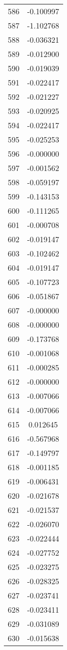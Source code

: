 \documentclass[12pt]{article}
\begin{document}
\begin{longtable}{@{}cc@{}}
586 & -0.100997 \\
587 & -1.102768 \\
588 & -0.036321 \\
589 & -0.012900 \\
590 & -0.019039 \\
591 & -0.022417 \\
592 & -0.021227 \\
593 & -0.020925 \\
594 & -0.022417 \\
595 & -0.025253 \\
596 & -0.000000 \\
597 & -0.001562 \\
598 & -0.059197 \\
599 & -0.143153 \\
600 & -0.111265 \\
601 & -0.000708 \\
602 & -0.019147 \\
603 & -0.102462 \\
604 & -0.019147 \\
605 & -0.107723 \\
606 & -0.051867 \\
607 & -0.000000 \\
608 & -0.000000 \\
609 & -0.173768 \\
610 & -0.001068 \\
611 & -0.000285 \\
612 & -0.000000 \\
613 & -0.007066 \\
614 & -0.007066 \\
615 & 0.012645 \\
616 & -0.567968 \\
617 & -0.149797 \\
618 & -0.001185 \\
619 & -0.006431 \\
620 & -0.021678 \\
621 & -0.021537 \\
622 & -0.026070 \\
623 & -0.022444 \\
624 & -0.027752 \\
625 & -0.023275 \\
626 & -0.028325 \\
627 & -0.023741 \\
628 & -0.023411 \\
629 & -0.031089 \\
630 & -0.015638 \\

\end{longtable}
\end{document}
